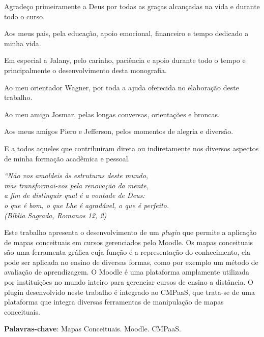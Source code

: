 \documentclass[
	12pt,				%
	openright,			%
	oneside,			%
	a4paper,			%
	english,			%
	french,				%
	spanish,			%
	brazil				%
	]{abntex2}
\begin{document}
\begin{agradecimentos}
	
Agradeço primeiramente a Deus por todas as graças alcançadas na vida e durante todo o curso.

Aos meus pais, pela educação, apoio emocional, financeiro e tempo dedicado a minha vida. 

Em especial a Jalany, pelo carinho, paciência e apoio durante todo o tempo e principalmente o desenvolvimento desta monografia.

Ao meu orientador Wagner, por toda a ajuda oferecida no elaboração deste trabalho.
 
Ao meu amigo Josmar, pelas longas conversas, orientações e broncas.

Aos meus amigos Piero e Jefferson, pelos momentos de alegria e diversão.

E a todos aqueles que contribuíram direta ou indiretamente nos diversos aspectos de
minha formação acadêmica e pessoal.

\end{agradecimentos}

\begin{epigrafe}
     \vspace*{\fill}
 	\begin{flushright}
 		\textit{``Não vos amoldeis às estruturas deste mundo, \\
 		mas transformai-vos pela renovação da mente, \\
 		a fim de distinguir qual é a vontade de Deus: \\
 		o que é bom, o que Lhe é agradável, o que é perfeito.\\
 		(Bíblia Sagrada, Romanos 12, 2)}
 	\end{flushright}
 \end{epigrafe}


\setlength{\absparsep}{18pt} %
\begin{resumo}
 Este trabalho apresenta o desenvolvimento de um \textit{plugin} que permite a aplicação de mapas conceituais em cursos gerenciados pelo Moodle. Os mapas conceituais são uma ferramenta gráfica cuja função é a representação do conhecimento, ela pode ser aplicada no ensino de diversas formas, como por exemplo um método de avaliação de aprendizagem. O Moodle é uma plataforma amplamente utilizada por instituições no mundo inteiro para gerenciar cursos de ensino a distância. O plugin desenvolvido neste trabalho é integrado ao CMPaaS, que trata-se de uma plataforma que integra diversas ferramentas de manipulação de mapas conceituais.

 \textbf{Palavras-chave}: Mapas Conceituais. Moodle. CMPaaS.
\end{resumo}
\end{document}
